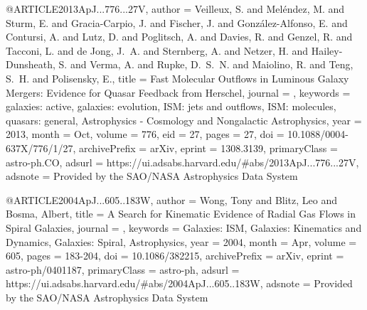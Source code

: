 \documentclass[longauth]{aa}
\begin{document}
{{{{@ARTICLE{2013ApJ...776...27V,
       author = {{Veilleux}, S. and {Mel{\'e}ndez}, M. and {Sturm}, E. and {Gracia-Carpio}, J. and {Fischer}, J. and {Gonz{\'a}lez-Alfonso}, E. and {Contursi}, A. and {Lutz}, D. and {Poglitsch}, A. and {Davies}, R. and {Genzel}, R. and {Tacconi}, L. and {de Jong}, J.~A. and {Sternberg}, A. and {Netzer}, H. and {Hailey-Dunsheath}, S. and {Verma}, A. and {Rupke}, D.~S.~N. and {Maiolino}, R. and {Teng}, S.~H. and {Polisensky}, E.},
        title = {Fast Molecular Outflows in Luminous Galaxy Mergers: Evidence for Quasar Feedback from Herschel},
      journal = {\apj},
     keywords = {galaxies: active, galaxies: evolution, ISM: jets and outflows, ISM: molecules, quasars: general, Astrophysics - Cosmology and Nongalactic Astrophysics},
         year = 2013,
        month = Oct,
       volume = {776},
          eid = {27},
        pages = {27},
          doi = {10.1088/0004-637X/776/1/27},
archivePrefix = {arXiv},
       eprint = {1308.3139},
 primaryClass = {astro-ph.CO},
       adsurl = {https://ui.adsabs.harvard.edu/#abs/2013ApJ...776...27V},
      adsnote = {Provided by the SAO/NASA Astrophysics Data System}
}

@ARTICLE{2004ApJ...605..183W,
       author = {{Wong}, Tony and {Blitz}, Leo and {Bosma}, Albert},
        title = {A Search for Kinematic Evidence of Radial Gas Flows in Spiral Galaxies},
      journal = {\apj},
     keywords = {Galaxies: ISM, Galaxies: Kinematics and Dynamics, Galaxies: Spiral, Astrophysics},
         year = 2004,
        month = Apr,
       volume = {605},
        pages = {183-204},
          doi = {10.1086/382215},
archivePrefix = {arXiv},
       eprint = {astro-ph/0401187},
 primaryClass = {astro-ph},
       adsurl = {https://ui.adsabs.harvard.edu/#abs/2004ApJ...605..183W},
      adsnote = {Provided by the SAO/NASA Astrophysics Data System}
}

}}}}
\end{document}
